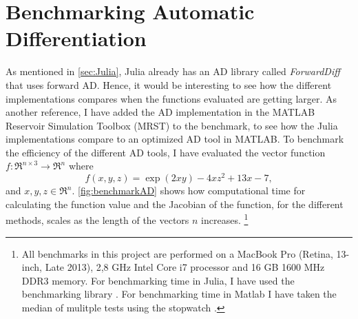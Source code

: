 \section{Benchmarking Automatic Differentiation}
As mentioned in \autoref{sec:Julia}, Julia already has an AD library called \textit{ForwardDiff} \emph{\citep{ForwardDiff}} that uses forward AD. Hence, it would be interesting to see how the different implementations compares when the functions evaluated are getting larger. As another reference, I have added the AD implementation in the MATLAB Reservoir Simulation Toolbox (MRST) \emph{\citep{mrstHomepage}} to the benchmark, to see how the Julia implementations compare to an optimized AD tool in MATLAB. To benchmark the efficiency of the different AD tools, I have evaluated the vector function $f: \Re^{n\times 3} \rightarrow \Re^n $ where
\begin{equation}
\label{eq:benchmarkFunction}
f(x,y,z)  = \exp(2xy) - 4xz^2 + 13x - 7,
\end{equation}
and $x,y,z \in \Re^n$. \autoref{fig:benchmarkAD} shows how computational time for calculating the function value and the Jacobian of the function, for the different methods, scales as the length of the vectors $n$ increases. \footnote{All benchmarks in this project are performed on a MacBook Pro (Retina, 13-inch, Late 2013), 2,8 GHz Intel Core i7 processor and 16 GB 1600 MHz DDR3 memory. For benchmarking time in Julia, I have used the benchmarking library \emph{\cite{BenchmarkTools}}. For benchmarking time in Matlab I have taken the median of mulitple tests using the stopwatch \emph{\cite{TicToc}}.}

